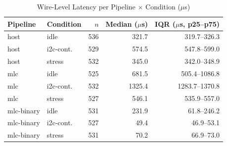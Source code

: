 \begin{table}[!t]
  \centering
  \caption{Wire-Level Latency per Pipeline $\times$ Condition ($\mu$s)}
  \label{tab:latency}
  \setlength{\tabcolsep}{4pt}
  \footnotesize
  \begin{tabular}{llrrr}
    \toprule
    Pipeline & Condition & $n$ & Median ($\mu$s) & IQR ($\mu$s, p25--p75) \\
    \midrule
    host       & idle      & 536 & 321.7  & 319.7--326.3   \\
    host       & i2c-cont. & 529 & 574.5  & 547.8--599.0   \\
    host       & stress    & 532 & 345.0  & 342.0--348.9   \\
    mlc        & idle      & 525 & 681.5  & 505.4--1086.8  \\
    mlc        & i2c-cont. & 532 & 1325.4 & 1283.7--1370.8 \\
    mlc        & stress    & 527 & 546.1  & 535.9--557.0   \\
    mlc-binary & idle      & 531 & 231.9  & 61.8--246.2    \\
    mlc-binary & i2c-cont. & 527 & 49.4   & 46.9--53.1     \\
    mlc-binary & stress    & 531 & 70.2   & 66.9--73.0     \\
    \bottomrule
  \end{tabular}
\end{table}